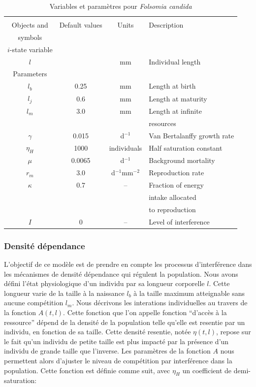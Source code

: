 \begin{table}
\caption{\label{tab:ANparam}Variables et paramètres pour \textit{Folsomia
candida}}
\begin{tabular}{cccl}
\hline
\hline 
 & & &\\
 Objects and  & Default values & Units & Description\\ 
symbols & & &\\
\hline
	$i$-state variable & & & \\ 
	$l$ &   & mm & Individual length \\ 
	Parameters & & & \\ 
	$l_{b}$ & 0.25 & mm & Length at birth \\ 
	$l_{j}$ & 0.6 & mm & Length at maturity \\ 
	$l_{m}$ & 3.0 & mm & Length at infinite\\
	& & &  resources \\ 
	$\gamma$ & 0.015 & d$^{-1}$ & Van Bertalanffy growth rate \\ 
	$\eta_{H}$ & 1000 & individuals & Half saturation constant \\ 
	$\mu$ & 0.0065 & d$^{-1}$ & Background mortality \\ 
	$r_{m}$ & 3.0 & d$^{-1}$mm$^{-2}$ & Reproduction rate \\ 
	$\kappa$ & 0.7 & -- & Fraction of energy \\
	  &   &   & intake allocated \\
	  &   &   & to reproduction \\ 
	  $I$ & 0 & -- & Level of interference\\
\hline 
\end{tabular} 
\end{table}

\subsubsection{Densité dépendance}

L'objectif de ce modèle est de prendre en compte les
processus d'interférence dans les mécanismes de densité dépendance qui régulent la population. Nous avons
défini l'état physiologique d'un individu par sa longueur corporelle $l$. Cette
longueur varie de la taille à la naissance $l_b$ à la taille maximum atteignable
sans aucune compétition $l_m$. Nous décrivons les interations individuelles au
travers de la fonction $A(t,l)$. Cette fonction que l'on appelle fonction
``d'accès à la ressource'' dépend de la densité de la population telle qu'elle
est resentie par un individu, en fonction de sa taille. Cette densité resentie,
notée $\eta (t,l)$, repose sur le fait qu'un individu de petite taille est plus
impacté par la présence d'un individu de grande taille que l'inverse. Les
paramètres de la fonction $A$ nous permettent alors d'ajuster le niveau de
compétition par interférence dans la population. Cette fonction est définie
comme suit, avec $\eta _H$ un coefficient de demi-saturation:

